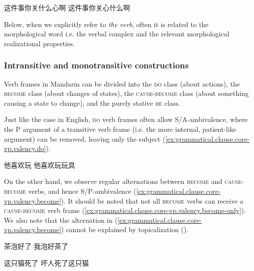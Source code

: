 \documentclass[UTF8, a4paper, oneside, scheme=plain, 12pt]{ctexrep}
\newcommand*{\term}[1]{\emph{#1}}
\newcommand*{\category}[1]{\textsc{#1}}
\begin{document}
\begin{exe}
    \ex\label{ex:grammatical.clause.core-vp.verbal-complex.separable.1} \begin{xlist}
        \ex\label{ex:grammatical.clause.core-vp.verbal-complex.separable.1.a} 这件事你关什么心啊
        \ex 这件事你关心什么啊
    \end{xlist}
\end{exe}
 
Below, when we explicitly refer to \term{the verb},
often it is related to the morphological word i.e. the verbal complex
and the relevant morphological realizational properties.

\subsubsection{Intransitive and monotransitive constructions}\label{sec:grammatical.clause.core-vp.transitivity}

Verb frames in Mandarin can be divided into the \category{do} class (about actions),
the \category{become} class (about changes of states),
the \category{cause}-\category{become} class (about something causing a state to change),
and the purely stative \category{be} class.

Just like the case in English, \category{do} verb frames often allow S/A-ambivalence,
where the P argument of a transitive verb frame (i.e. the more internal, patient-like argument) can be removed, leaving only the subject (\ref{ex:grammatical.clause.core-vp.valency.do}).

\begin{exe}
    \ex\label{ex:grammatical.clause.core-vp.valency.do} \begin{xlist}
        \ex 他喜欢玩
        \ex 他喜欢玩玩具
    \end{xlist}
\end{exe}

On the other hand, we observe regular alternations between \category{become} and \category{cause}-\category{become} verbs,
and hence S/P-ambivalence (\ref{ex:grammatical.clause.core-vp.valency.become}).
It should be noted that not all \category{become} verbs can receive a \category{cause}-\category{become} verb frame (\ref{ex:grammatical.clause.core-vp.valency.become-only}).
We also note that the alternation in (\ref{ex:grammatical.clause.core-vp.valency.become})
cannot be explained by topicalization ().

\begin{exe}
    \ex\label{ex:grammatical.clause.core-vp.valency.become} \begin{xlist}
        \ex\label{ex:grammatical.clause.core-vp.valency.become.1} 茶泡好了
        \ex 我泡好茶了
    \end{xlist}

    \ex\label{ex:grammatical.clause.core-vp.valency.become-only}
    \begin{xlist}
        \ex\label{ex:grammatical.clause.core-vp.valency.become-only.1} 这只猫死了
        \ex *坏人死了这只猫
    \end{xlist}
\end{exe}
\end{document}
